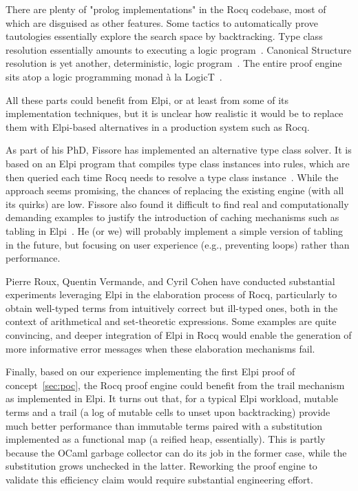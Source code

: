 \documentclass[a4paper, 11pt]{book}
\begin{document}
There are plenty of "prolog implementations" in the Rocq codebase, most of
which are disguised as other features. Some tactics to automatically prove
tautologies essentially explore the search space by backtracking. Type class
resolution essentially amounts to executing a logic program~\cite{fctc}.
Canonical Structure resolution is yet another, deterministic, logic
program~\cite{tassi13}. The entire proof engine sits atop a logic programming
monad à la LogicT~\cite{logicT}.

All these parts could benefit from Elpi, or at least from some of its
implementation techniques, but it is unclear how realistic it would be to
replace them with Elpi-based alternatives in a production system such as Rocq.

As part of his PhD, Fissore has implemented an alternative type class solver.
It is based on an Elpi program that compiles type class instances into rules,
which are then queried each time Rocq needs to resolve a type class
instance~\cite{newtc,unifforfree}. While the approach seems promising, the
chances of replacing the existing engine (with all its quirks) are low. Fissore
also found it difficult to find real and computationally demanding examples to
justify the introduction of caching mechanisms such as tabling in
Elpi~\cite{selsam2020tabledtypeclassresolution,brigittePHD}. He (or we) will
probably implement a simple version of tabling in the future, but focusing on
user experience (e.g., preventing loops) rather than performance.

Pierre Roux, Quentin Vermande, and Cyril Cohen have conducted substantial
experiments leveraging Elpi in the elaboration process of Rocq, particularly to
obtain well-typed terms from intuitively correct but ill-typed ones, both in
the context of arithmetical and set-theoretic expressions. Some examples are
quite convincing, and deeper integration of Elpi in Rocq would enable the
generation of more informative error messages when these elaboration mechanisms
fail.

Finally, based on our experience implementing the first Elpi proof of
concept~\ref{sec:poc}, the Rocq proof engine could benefit from the trail
mechanism as implemented in Elpi. It turns out that, for a typical Elpi
workload, mutable terms and a trail (a log of mutable cells to unset upon
backtracking) provide much better performance than immutable terms paired with
a substitution implemented as a functional map (a reified heap, essentially).
This is partly because the OCaml garbage collector can do its job in the former
case, while the substitution grows unchecked in the latter. Reworking the proof
engine to validate this efficiency claim would require substantial engineering
effort.

\nocite{*}
\printbibliography[title={Our Bibliography}, keyword=me]
\printbibliography[title={Bibliography}, keyword=they]
\end{document}
